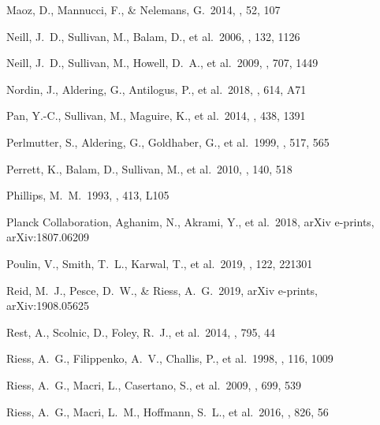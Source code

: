 \documentclass[]{aa} %
\begin{document}
\begin{thebibliography}{}
 Maoz, D., Mannucci, F., \&
Nelemans, G.\ 2014, \araa, 52, 107 



 Neill, J.~D., Sullivan, M., Balam, D.,
et al.\ 2006, \aj, 132, 1126

 Neill, J.~D., Sullivan, M., Howell,
D.~A., et al.\ 2009, \apj, 707, 1449

 Nordin, J., Aldering, G., Antilogus,
P., et al.\ 2018, \aap, 614, A71


 Pan, Y.-C., Sullivan, M., Maguire, K., et
al.\ 2014, \mnras, 438, 1391

 Perlmutter, S., Aldering, G.,
Goldhaber, G., et al.\ 1999, \apj, 517, 565

 Perrett, K., Balam, D., Sullivan,
M., et al.\ 2010, \aj, 140, 518

 Phillips, M.~M.\ 1993, \apjl, 413, L105


 Planck Collaboration,
Aghanim, N., Akrami, Y., et al.\ 2018, arXiv e-prints, arXiv:1807.06209

 Poulin, V., Smith, T.~L., Karwal, T.,
et al.\ 2019, \prl, 122, 221301


 Reid, M.~J., Pesce, D.~W., \& Riess,
A.~G.\ 2019, arXiv e-prints, arXiv:1908.05625

 Rest, A., Scolnic, D., Foley, R.~J., et
al.\ 2014, \apj, 795, 44

 Riess, A.~G., Filippenko, A.~V.,
Challis, P., et al.\ 1998, \aj, 116, 1009

 Riess, A.~G., Macri, L., Casertano, S.,
et al.\ 2009, \apj, 699, 539

 Riess, A.~G., Macri, L.~M., Hoffmann,
S.~L., et al.\ 2016, \apj, 826, 56


\end{thebibliography}
\end{document}
